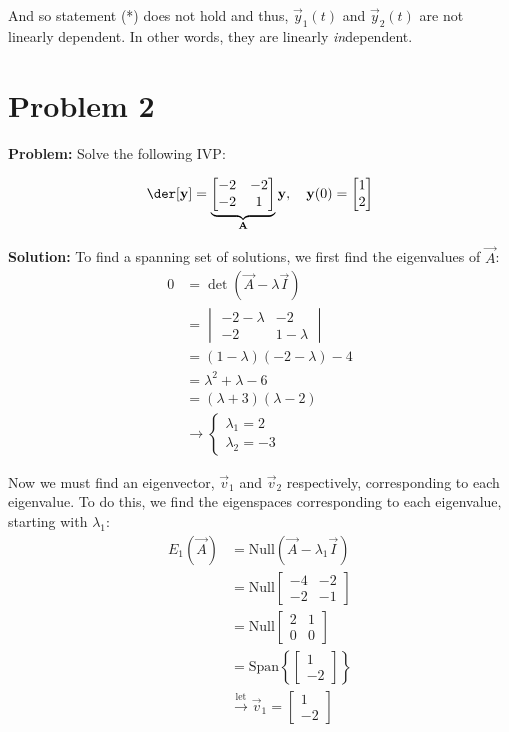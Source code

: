 \documentclass{article}
\begin{document}
And so statement (*) does not hold and thus, $\vec y_1(t)$ and $\vec y_2(t)$ are not linearly dependent. In other words, they are linearly \textit{in}dependent.

\section*{Problem 2}
\noindent\textbf{Problem:} Solve the following IVP:

\begin{equation*}
  \der[\vec y]=\underbrace{\begin{bmatrix}
    -2&-2\\-2&1
  \end{bmatrix}}_{\vec A}\vec y,\quad \vec y(0)=\begin{bmatrix}
    1\\2
  \end{bmatrix}
\end{equation*}

\noindent\textbf{Solution:} To find a spanning set of solutions, we first find the eigenvalues of $\vec A$:
\begin{align*}
  0&=\det(\vec A-\lambda \vec I)\\
  &=\begin{vmatrix} -2-\lambda & -2 \\ -2 & 1-\lambda \end{vmatrix}\\
  &=(1-\lambda)(-2-\lambda)-4\\
  &=\lambda^2+\lambda-6\\
  &=(\lambda+3)(\lambda-2)\\
  &\longrightarrow \begin{cases}
    \lambda_1=2\\
    \lambda_2=-3
  \end{cases}
\end{align*}

Now we must find an eigenvector, $\vec v_1$ and $\vec v_2$ respectively, corresponding to each eigenvalue. To do this, we find the eigenspaces corresponding to each eigenvalue, starting with $\lambda_1$:
\begin{align*}
  E_1(\vec A)&=\text{Null}(\vec A-\lambda_1\vec I)\\
&=\text{Null}\begin{bmatrix} -4 & -2 \\ -2 & -1 \end{bmatrix}\\
&=\text{Null}\begin{bmatrix} 2 & 1 \\ 0 & 0 \end{bmatrix}\tag{ref}\\
&=\text{Span}\left\{\begin{bmatrix} 1\\-2\end{bmatrix}\right\}\tag{$x_2=-2x_1$}\\
&\stackrel{\text{let}}{\longrightarrow} \vec v_1=\begin{bmatrix} 1\\-2\end{bmatrix}
\end{align*}
\end{document}
